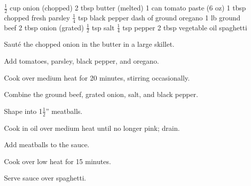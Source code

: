 \dishtype{\main}
\begin{ingreds}
    $\frac{1}{2}$ cup onion (chopped)
    2 tbsp butter (melted)
    1 can tomato paste (6 oz)
    1 tbsp chopped fresh parsley
    $\frac{1}{4}$ tsp black pepper
    dash of ground oregano
    1 lb ground beef
    2 tbsp onion (grated)
    $\frac{1}{2}$ tsp salt
    $\frac{1}{4}$ tsp pepper
    2 tbsp vegetable oil
    spaghetti
\end{ingreds}
\begin{method}
    Saut\'e the chopped onion in the butter in a large skillet.\par
    Add tomatoes, parsley, black pepper, and oregano.\par
    Cook over medium heat for 20 minutes, stirring occasionally.\par
    Combine the ground beef, grated onion, salt, and black pepper.\par
    Shape into 1$\frac{1}{2}$'' meatballs.\par
    Cook in oil over medium heat until no longer pink; drain.\par
    Add meatballs to the sauce.\par
    Cook over low heat for 15 minutes.\par
    Serve sauce over spaghetti.
\end{method}